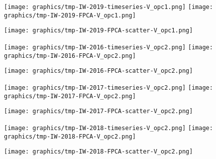 
\begin{center}
\begin{minipage}{7.0in}
\texttt{[image: graphics/tmp-IW-2019-timeseries-V\_opc1.png]}
\quad
\texttt{[image: graphics/tmp-IW-2019-FPCA-V\_opc1.png]}
\vskip 1.0cm
\begin{center}
\texttt{[image: graphics/tmp-IW-2019-FPCA-scatter-V\_opc1.png]}
\end{center}
\end{minipage}
\end{center}


\begin{center}
\begin{minipage}{7.0in}
\texttt{[image: graphics/tmp-IW-2016-timeseries-V\_opc2.png]}
\quad
\texttt{[image: graphics/tmp-IW-2016-FPCA-V\_opc2.png]}
\vskip 1.0cm
\begin{center}
\texttt{[image: graphics/tmp-IW-2016-FPCA-scatter-V\_opc2.png]}
\end{center}
\end{minipage}
\end{center}


\begin{center}
\begin{minipage}{7.0in}
\texttt{[image: graphics/tmp-IW-2017-timeseries-V\_opc2.png]}
\quad
\texttt{[image: graphics/tmp-IW-2017-FPCA-V\_opc2.png]}
\vskip 1.0cm
\begin{center}
\texttt{[image: graphics/tmp-IW-2017-FPCA-scatter-V\_opc2.png]}
\end{center}
\end{minipage}
\end{center}


\begin{center}
\begin{minipage}{7.0in}
\texttt{[image: graphics/tmp-IW-2018-timeseries-V\_opc2.png]}
\quad
\texttt{[image: graphics/tmp-IW-2018-FPCA-V\_opc2.png]}
\vskip 1.0cm
\begin{center}
\texttt{[image: graphics/tmp-IW-2018-FPCA-scatter-V\_opc2.png]}
\end{center}
\end{minipage}
\end{center}

